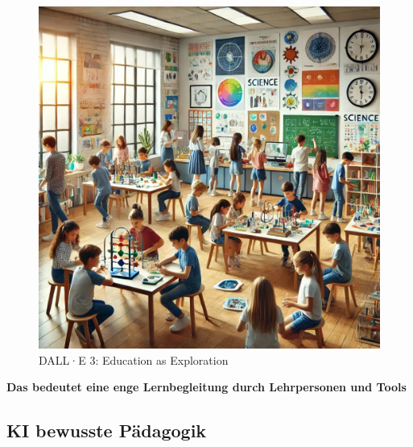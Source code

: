 \documentclass[
  letterpaper,
  DIV=11,
  numbers=noendperiod]{scrartcl}
\begin{document}
\begin{figure}[H]

{\centering \includegraphics[width=1\textwidth,height=\textheight]{images/explorer_education1.webp}

}

\caption{DALL·E 3: Education as Exploration}

\end{figure}%

\textbf{Das bedeutet eine enge Lernbegleitung durch Lehrpersonen und
Tools}

\subsection{KI bewusste Pädagogik}\label{ki-bewusste-puxe4dagogik-1}
\end{document}
